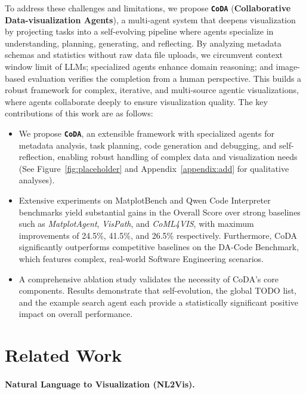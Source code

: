 \documentclass[11pt, a4paper, logo, copyright]{googlecloud}
\newcommand{\methodname}{\textbf{\texttt{\textcolor{StarIndigo}{C}\textcolor{StarIndigo}{o}\textcolor{StarCoral}{D}\textcolor{StarTeal}{A}}}}
\begin{document}
To address these challenges and limitations, we propose \methodname{} (\textbf{\textcolor{StarIndigo}{Collaborative} \textcolor{StarCoral}{Data-visualization} \textcolor{StarTeal}{Agents}}), a multi-agent system that deepens visualization by projecting tasks into a self-evolving pipeline where agents specialize in understanding, planning, generating, and reflecting. 
By analyzing metadata schemas and statistics without raw data file uploads, we circumvent context window limit of LLMs; specialized agents enhance domain reasoning; and image-based evaluation verifies the completion from a human perspective. This builds a robust framework for complex, iterative, and multi-source agentic visualizations, where agents collaborate deeply to ensure visualization quality.
The key contributions of this work are as follows:
\begin{itemize}[itemsep=0pt, parsep=0pt, topsep=0pt, leftmargin=2em]
    \item We propose \methodname{}, an extensible framework with specialized agents for metadata analysis, task planning, code generation and debugging, and self-reflection, enabling robust handling of complex data and visualization needs (See Figure~\ref{fig:placeholder} and Appendix~\ref{appendix:add} for qualitative analyses).
    \item Extensive experiments on MatplotBench and Qwen Code Interpreter benchmarks yield substantial gains in the Overall Score over strong baselines such as \textit{MatplotAgent}, \textit{VisPath}, and \textit{CoML4VIS}, with maximum improvements of 24.5\%, 41.5\%, and 26.5\% respectively. Furthermore, CoDA significantly outperforms competitive baselines on the DA-Code Benchmark, which features complex, real-world Software Engineering scenarios.
    \item A comprehensive ablation study validates the necessity of CoDA's core components. Results demonstrate that self-evolution, the global TODO list, and the example search agent each provide a statistically significant positive impact on overall performance.
\end{itemize}



\section{Related Work}
\paragraph{Natural Language to Visualization (NL2Vis).}
\end{document}
